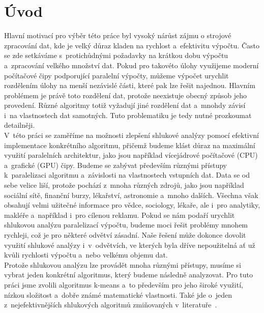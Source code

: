 \pagestyle{plain}
\setcounter{page}{1}

\chapter{Úvod}
Hlavní motivací pro výběr této práce byl vysoký nárůst zájmu o strojové zpracování dat, kde je velký důraz kladen na rychlost a~efektivitu výpočtu. Často se zde setkáváme s~protichůdnými požadavky na krátkou dobu výpočtu a~zpracování velkého množství dat.
Pokud pro takovéto úlohy využijeme moderní počítačové čipy podporující paralelní výpočty, můžeme výpočet urychlit rozdělením úlohy na menší nezávislé části, které pak lze řešit najednou. Hlavním problémem je právě toto rozdělení dat, protože neexistuje obecný způsob jeho provedení. Různé algoritmy totiž vyžadují jiné rozdělení dat a~mnohdy závisí i~na vlastnostech dat samotných. Tuto problematiku je tedy nutné prozkoumat detailněji.\\

V~této práci se zaměříme na možnosti zlepšení shlukové analýzy pomocí efektivní implementace konkrétního algoritmu, přičemž budeme klást důraz na maximální využití paralelních architektur, jako jsou například vícejádrové počítačové (CPU) a~grafické (GPU) čipy. Budeme se zabývat především různými přístupy k~paralelizaci algoritmu a~závislosti na vlastnostech vstupních dat.
Data se od sebe velice liší, protože pochází z~mnoha různých zdrojů, jako jsou například sociální sítě, finanční burzy, lékařství, astronomie a~mnoho dalších. Všechna však obsahují velmi užitečné informace pro vědce, sociology, lékaře, ale i~pro analytiky, makléře a~například i~pro cílenou reklamu.
Pokud se nám podaří urychlit shlukovou analýzu paralelizací výpočtu, budeme moci řešit problémy mnohem rychleji, což je pro některé odvětví zásadní. Naše řešení může dokonce dovolit využití shlukové analýzy i~v~odvětvích, ve kterých byla dříve nepoužitelná ať už kvůli rychlosti výpočtu a~nebo velkému objemu dat.\\

Protože shlukovou analýzu lze provádět mnoha různými přístupy, musíme si vybrat jeden konkrétní algoritmus, který budeme následně analyzovat. Pro tuto práci jsme zvolili algoritmus k-means a~to především pro jeho široké využití, nízkou složitost a~dobře známé matematické vlastnosti. Také jde o~jeden z~nejefektivnějších shlukových algoritmů zmiňovaných v~literatuře~\cite{Aggarwal13}.\\

